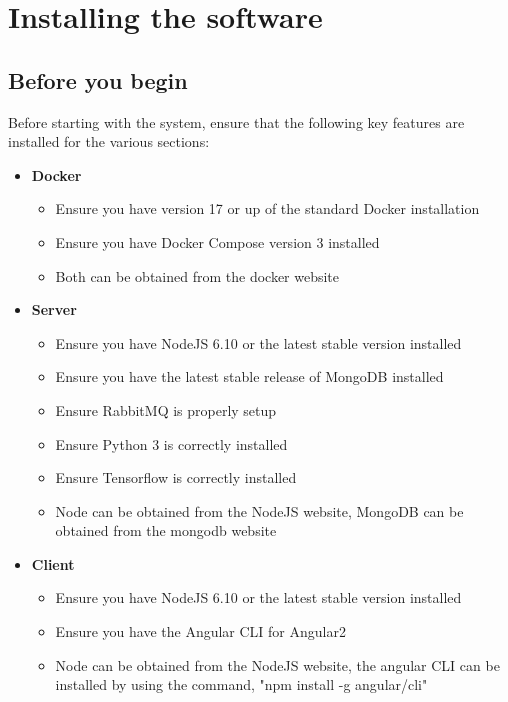 \documentclass[a4paper,12pt]{article}
\begin{document}
  	\pagebreak
  	
    \section{Installing the software}

    	\subsection{Before you begin}
    	
    	Before starting with the system, ensure that the following key features are installed for the various sections:
    	
    	\begin{itemize}
    		\item \textbf{Docker}
    		\begin{itemize}
    			\item Ensure you have version 17 or up of the standard Docker installation
    			\item Ensure you have Docker Compose version 3 installed
    			\item Both can be obtained from the docker website
    		\end{itemize}
    	\end{itemize}
    
    	\begin{itemize}
	    	\item \textbf{Server}
	    	\begin{itemize}
	    		\item Ensure you have NodeJS 6.10 or the latest stable version installed
	    		\item Ensure you have the latest stable release of MongoDB installed
	    		\item Ensure RabbitMQ is properly setup
	    		\item Ensure Python 3 is correctly installed
	    		\item Ensure Tensorflow is correctly installed
	    		\item Node can be obtained from the NodeJS website, MongoDB can be obtained from the mongodb website
	    	\end{itemize}
    	\end{itemize}
    
       	\begin{itemize}
	    	\item \textbf{Client}
	    	\begin{itemize}
    			\item Ensure you have NodeJS 6.10 or the latest stable version installed
    			\item Ensure you have the Angular CLI for Angular2
	    		\item Node can be obtained from the NodeJS website, the angular CLI can be installed by using the command, "npm install -g angular/cli" 
	    	\end{itemize}
    	\end{itemize}
   	
\end{document}
